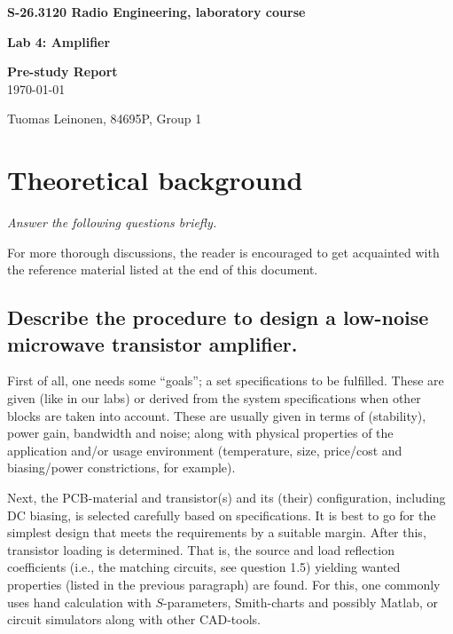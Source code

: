 \documentclass[a4paper, 12pt]{article}
\newlength{\oneLine}
\begin{document}
\begin{titlepage}
\pagestyle{empty}
\begin{center}

\vspace*{30mm}
\noindent\LARGE{\textbf{S-26.3120 Radio Engineering, laboratory course}}

\vspace*{20mm}

\Large{\textbf{Lab 4: Amplifier}}\\

\vspace*{15mm}

\large{\textbf{Pre-study Report}}\\
\vspace{15mm}
\large{\today}
	
\vspace*{30mm}
\large{Tuomas Leinonen, 84695P, Group 1}

\end{center}

\end{titlepage}

\section{Theoretical background}

\textit{Answer the following questions briefly.}

\vspace*{0.5\oneLine}
\noindent
For more thorough discussions, the reader is encouraged to get acquainted with 
the reference material listed at the end of this document.

\subsection{Describe the procedure to design a low-noise microwave transistor amplifier.}

First of all, one needs some ``goals''; a set specifications to be fulfilled. These are 
given (like in our labs) or derived from the system specifications when other blocks are 
taken into account. These are usually given in terms of (stability), power gain, bandwidth 
and noise; along with physical properties of the application and/or usage environment 
(temperature, size, price/cost and biasing/power constrictions, for example).

Next, the PCB-material and transistor(s) and its (their) configuration, including DC biasing, 
is selected carefully based on specifications. It is best to go for the simplest design that 
meets the requirements by a suitable margin. After this, transistor loading is determined. 
That is, the source and load reflection coefficients (i.e., the matching circuits, 
see question 1.5) yielding wanted properties (listed in the previous paragraph) are 
found. For this, one commonly uses hand calculation with $S$-parameters, Smith-charts 
and possibly Matlab, or circuit simulators along with other CAD-tools.
\end{document}
